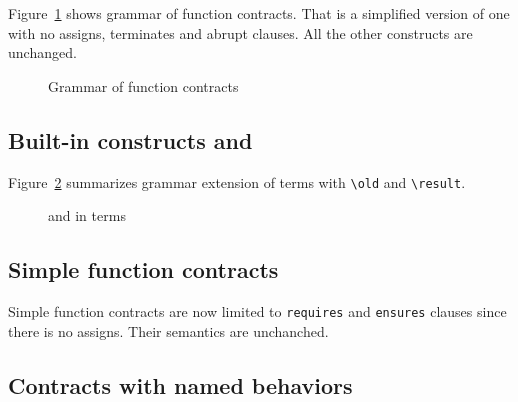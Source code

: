 
Figure~\ref{fig:gram:contracts} shows grammar of function contracts. That is a
simplified version of \acsl one with no assigns, terminates and abrupt
clauses. All the other constructs are unchanged.
\begin{figure}[htbp]
  \begin{cadre}
      
   \end{cadre}
    \caption{Grammar of function contracts}
  \label{fig:gram:contracts}
\end{figure}


\subsection{Built-in constructs %
  \texorpdfstring{\old}{\textbackslash{}old} %
 and \texorpdfstring{\result}{\textbackslash{}result}}

\nodiff

Figure~\ref{fig:gram:oldandresult} summarizes grammar extension of terms with
\lstinline|\old| and \lstinline|\result|.
\begin{figure}[htbp]
  \begin{cadre}
      
    \end{cadre}
    \caption{\protect\old and \protect\result in terms}
  \label{fig:gram:oldandresult}
\end{figure}



\subsection{Simple function contracts}
\label{sec:simplecontracts}


Simple function contracts are now limited to \lstinline|requires| and
\lstinline|ensures| clauses since there is no assigns. Their semantics are
unchanched.


\subsection{Contracts with named behaviors}
\label{subsec:behaviors}

